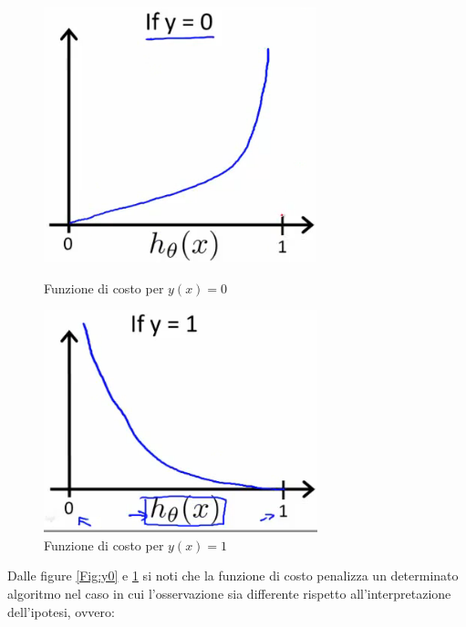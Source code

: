 \begin{figure}[!htb]
   \begin{minipage}{0.48\textwidth}
     \centering
     \includegraphics[width=.7\linewidth]{img/Ut7vvXnxEead-BJkoDOYOw_f719f2858d78dd66d80c5ec0d8e6b3fa_Logistic_regression_cost_function_negative_class.png}
     \caption{Funzione di costo per $y(x) = 0$}\label{Fig:y0}
   \end{minipage}\hfill
   \begin{minipage}{0.48\textwidth}
     \centering
     \includegraphics[width=.7\linewidth]{img/Q9sX8nnxEeamDApmnD43Fw_1cb67ecfac77b134606532f5caf98ee4_Logistic_regression_cost_function_positive_class.png}
     \caption{Funzione di costo per $y(x) = 1$}\label{Fig:y1}
   \end{minipage}
\end{figure}
Dalle figure \ref{Fig:y0} e \ref{Fig:y1} si noti che la funzione di costo penalizza un determinato algoritmo nel caso in cui l'osservazione sia differente rispetto all'interpretazione dell'ipotesi, ovvero:

